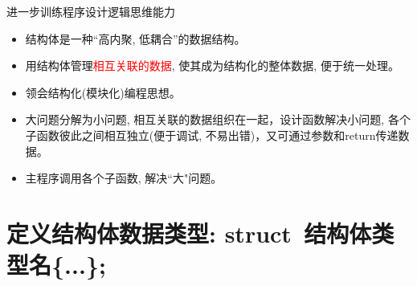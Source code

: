 
\begin{frame}{进一步训练程序设计逻辑思维能力}
\begin{itemize}\itemsep=.5cm
	\item 结构体是一种``高内聚, 低耦合''的数据结构。 
	\item 用结构体管理\textcolor{red}{相互关联的数据}, 使其成为结构化的整体数据, 便于统一处理。 
	\item 领会结构化(模块化)编程思想。
	\item 大问题分解为小问题, 相互关联的数据组织在一起，设计函数解决小问题, 各个子函数彼此之间相互独立(便于调试, 不易出错)，又可通过参数和return传递数据。
	\item 主程序调用各个子函数, 解决``大"问题。
\end{itemize}
\end{frame}



\section{定义结构体数据类型:  struct\, 结构体类型名\{...\};}

